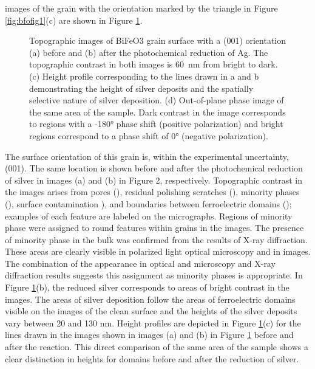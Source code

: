 \documentclass[12pt,%
              twoside,
               letterpaper]{uiothesis}
\begin{document}
 images of the grain with the orientation marked by the triangle in Figure
\ref{fig:bfofig1}(c) are shown in Figure \ref{fig:bfofig2}.
\begin{figure}
	\caption[Topographic  images of BiFeO3 grain surface]{%
		Topographic  images of BiFeO3 grain surface 
		with a (001) orientation (a) before and (b) after the 
		photochemical reduction of Ag. The topographic contrast 
		in both images is \SI{60}{\nano\meter} from bright to 
		dark. (c) Height profile corresponding to the lines drawn 
		in a and b demonstrating the height of silver deposits 
		and the spatially selective nature of silver deposition. 
		(d) Out-of-plane  phase image of the same area of the 
		sample. Dark contrast in the image corresponds to regions 
		with a -180\si{\degree} phase shift (positive polarization) 
		and bright regions correspond to a phase shift of 0\si{\degree} 
		(negative polarization).}
	\label{fig:bfofig2}
\end{figure}
The surface orientation of this grain is, within the experimental uncertainty, (001). The
same location is shown before and after the photochemical reduction of silver in images
(a) and (b) in Figure 2, respectively. Topographic contrast in the  images
arises from pores (), residual polishing scratches (), minority phases
(), surface contamination ), and boundaries between ferroelectric
domains ();\cite{Catalan:2009ca} examples of each feature are labeled on the
micrographs. \label{minorityphase}Regions of minority phase were assigned to round
features within grains in the  images. The presence of minority phase in the
bulk was confirmed from the results of X-ray diffraction. These areas are clearly visible
in polarized light optical microscopy and in  images. The combination of the
appearance in optical and  microscopy and X-ray diffraction results suggests
this assignment as minority phases is appropriate. In Figure \ref{fig:bfofig2}(b), the
reduced silver corresponds to areas of bright contrast in the  images. The areas
of silver deposition follow the areas of ferroelectric domains visible on the images of
the clean surface and the heights of the silver deposits vary between 20 and 130 nm.
Height profiles are depicted in Figure \ref{fig:bfofig2}(c) for the lines drawn in the
 images shown in images (a) and (b) in Figure \ref{fig:bfofig2} before and after
the reaction. This direct comparison of the same area of the sample shows a clear
distinction in heights for domains before and after the reduction of silver.
\end{document}
